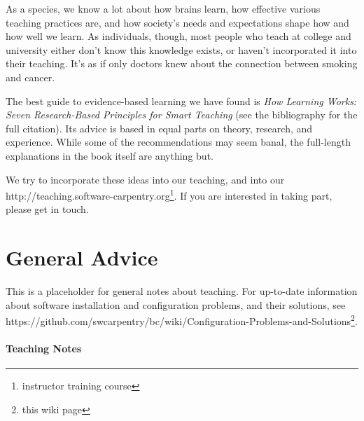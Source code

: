 \documentclass[]{book}
\newcommand{\urlfoot}[2]{{#1}\footnote{#2}}
\begin{document}
As a species, we know a lot about how brains learn, how effective
various teaching practices are, and how society's needs and expectations
shape how and how well we learn. As individuals, though, most people who
teach at college and university either don't know this knowledge exists,
or haven't incorporated it into their teaching. It's as if only doctors
knew about the connection between smoking and cancer.

The best guide to evidence-based learning we have found is \emph{How
Learning Works: Seven Research-Based Principles for Smart Teaching} (see
the bibliography for the full citation). Its advice is based in equal
parts on theory, research, and experience. While some of the
recommendations may seem banal, the full-length explanations in the book
itself are anything but.

We try to incorporate these ideas into our teaching, and into our
\urlfoot{http://teaching.software-carpentry.org}{instructor training
course}. If you are interested in taking part, please get in touch.

\section{General Advice}

This is a placeholder for general notes about teaching. For up-to-date
information about software installation and configuration problems, and
their solutions, see
\urlfoot{https://github.com/swcarpentry/bc/wiki/Configuration-Problems-and-Solutions}{this
wiki page}.

\mbox{}\paragraph{Teaching Notes}
\end{document}
